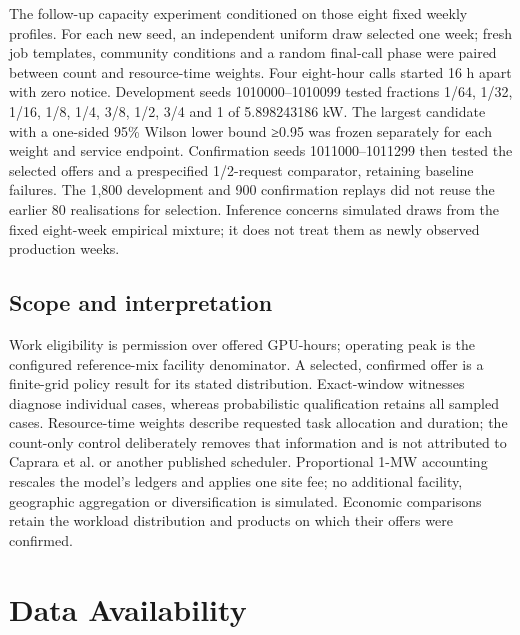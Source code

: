 \documentclass[10pt,a4paper]{article}
\begin{document}
The follow-up capacity experiment conditioned on those eight fixed weekly profiles. For each new seed, an independent uniform draw selected one week; fresh job templates, community conditions and a random final-call phase were paired between count and resource-time weights. Four eight-hour calls started 16 h apart with zero notice. Development seeds 1010000–1010099 tested fractions 1/64, 1/32, 1/16, 1/8, 1/4, 3/8, 1/2, 3/4 and 1 of 5.898243186 kW. The largest candidate with a one-sided 95\% Wilson lower bound ≥0.95 was frozen separately for each weight and service endpoint. Confirmation seeds 1011000–1011299 then tested the selected offers and a prespecified 1/2-request comparator, retaining baseline failures. The 1,800 development and 900 confirmation replays did not reuse the earlier 80 realisations for selection. Inference concerns simulated draws from the fixed eight-week empirical mixture; it does not treat them as newly observed production weeks.


\subsection*{Scope and interpretation}

Work eligibility is permission over offered GPU-hours; operating peak is the configured reference-mix facility denominator. A selected, confirmed offer is a finite-grid policy result for its stated distribution. Exact-window witnesses diagnose individual cases, whereas probabilistic qualification retains all sampled cases. Resource-time weights describe requested task allocation and duration; the count-only control deliberately removes that information and is not attributed to Caprara et al. or another published scheduler. Proportional 1-MW accounting rescales the model's ledgers and applies one site fee; no additional facility, geographic aggregation or diversification is simulated. Economic comparisons retain the workload distribution and products on which their offers were confirmed.


\section*{Data Availability}
\end{document}
